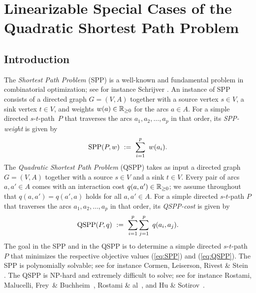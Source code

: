 \chapter{Linearizable Special Cases of the Quadratic Shortest Path Problem}
\label{ch:linearization-1}


\section{Introduction}
The \emph{Shortest Path Problem} (SPP) is a well-known and fundamental problem in 
combinatorial optimization; see for instance Schrijver \cite{Schrijver2012}.
An instance of SPP consists of a directed graph $G=(V,A)$ together with a source vertex $s\in V$, 
a sink vertex $t\in V$, and weights $w(a)\in{\mathbb{R}_{\ge0}}$ for the arcs $a\in A$.
For a simple directed $s$-$t$-path~$P$ that traverses the arcs $a_1,a_2,\ldots,a_p$ in that order,
its \emph{SPP-weight} is given by
\begin{equation}
\label{eq:SPP}
\text{SPP}(P,w) ~:=~ \sum_{i=1}^p~ w(a_i).
\end{equation}
The \emph{Quadratic Shortest Path Problem} (QSPP) takes as input a directed graph $G=(V,A)$ together
with a source $s\in V$ and a sink $t\in V$.
Every pair of arcs $a,a'\in A$ comes with an interaction cost $q(a,a')\in{\mathbb{R}_{\ge0}}$;
we assume throughout that $q(a,a')=q(a',a)$ holds for all $a,a'\in A$.
For a simple directed $s$-$t$-path $P$ that traverses the arcs $a_1,a_2,\ldots,a_p$ in that order,
its \emph{QSPP-cost} is given by 
\begin{equation}
\label{eq:QSPP}
\text{QSPP}(P,q) ~:=~ \sum_{i=1}^p\sum_{j=1}^p~ q(a_i,a_j).
\end{equation}
The goal in the SPP and in the QSPP is to determine a simple directed $s$-$t$-path $P$ that 
minimizes the respective objective values (\ref{eq:SPP}) and (\ref{eq:QSPP}).
The SPP is polynomially solvable; see for instance Cormen, Leiserson, Rivest \& Stein \cite{CLRS}.
The QSPP is NP-hard and extremely difficult to solve;
see for instance Rostami, Malucelli, Frey~\& Buchheim~\cite{rostami2015},
Rostami \& al~\cite{rostami2018}, and Hu \& Sotirov~\cite{huSo2018,huSo2021,huSo2020}.

